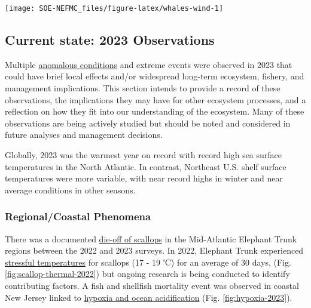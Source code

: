 \documentclass[
  10pt,
]{article}
\let\origfigure\figure
\let\endorigfigure\endfigure
\renewenvironment{figure}[1][2] {
    \expandafter\origfigure\expandafter[H]
} {
    \endorigfigure
}
\begin{document}
\begin{figure}

{\centering \texttt{[image: SOE-NEFMC\_files/figure-latex/whales-wind-1]} 

}

\caption{Northern Right Whale persistent hotspots and Wind Energy Areas. Areas outlined in black show active or proposed wind energy leases.}\label{fig:whales-wind}
\end{figure}
\newpage

\hypertarget{current-state-2023-observations}{%
\subsection{Current state: 2023 Observations}\label{current-state-2023-observations}}

Multiple \href{https://noaa-edab.github.io/catalog/observation-synthesis.html}{anomalous conditions} and extreme events were observed in 2023 that could have brief local effects and/or widespread long-term ecosystem, fishery, and management implications. This section intends to provide a record of these observations, the implications they may have for other ecosystem processes, and a reflection on how they fit into our understanding of the ecosystem. Many of these observations are being actively studied but should be noted and considered in future analyses and management decisions.

Globally, 2023 was the warmest year on record with record high sea surface temperatures in the North Atlantic. In contrast, Northeast U.S. shelf surface temperatures were more variable, with near record highs in winter and near average conditions in other seasons.

\hypertarget{regionalcoastal-phenomena}{%
\subsubsection{Regional/Coastal Phenomena}\label{regionalcoastal-phenomena}}

There was a documented \href{https://noaa-edab.github.io/catalog/observation-synthesis.html}{die-off of scallops} in the Mid-Atlantic Elephant Trunk regions between the 2022 and 2023 surveys. In 2022, Elephant Trunk experienced \href{https://noaa-edab.github.io/catalog/thermal-habitat-persistence.html}{stressful temperatures} for scallops (17 - 19 ℃) for an average of 30 days, (Fig. \ref{fig:scallop-thermal-2022}) but ongoing research is being conducted to identify contributing factors. A fish and shellfish mortality event was observed in coastal New Jersey linked to \href{https://noaa-edab.github.io/catalog/ocean-acidification-and-other-stressors.html}{hypoxia and ocean acidification} (Fig. \ref{fig:hypoxia-2023}).
\end{document}
